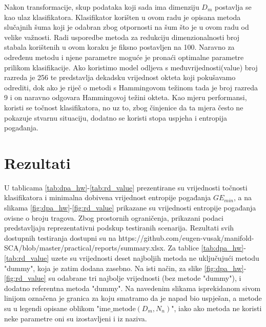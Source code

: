 \documentclass[times, utf8, diplomski]{fer}
\begin{document}
Nakon transformacije, skup podataka koji sada ima dimenziju $D_m$ postavlja se kao ulaz klasifikatora. Klasifikator korišten u ovom radu je opisana metoda slučajnih šuma koji je odabran zbog otpornosti na šum što je u ovom  radu od velike važnosti. Radi usporedbe metoda za redukciju dimenzionalnosti broj stabala korištenih u ovom koraku je fiksno postavljen na 100. Naravno za određenu metodu i njene parametre moguće je pronaći optimalne parametre prilikom klasifikacije. Ako koristimo model odljeva s međuvrijednosti(value) broj razreda je 256 te predstavlja dekadsku vrijednost okteta koji pokušavamo odrediti, dok ako je riječ o metodi s Hammingovom težinom tada je broj razreda 9 i on naravno odgovara Hammingovoj težini okteta. Kao mjeru performansi, koristi se točnost klasifikatora, no uz to, zbog činjenice da ta mjera često ne pokazuje stvarnu situaciju, dodatno se koristi stopa uspjeha  i entropija pogađanja.

\section{Rezultati}

U tablicama \ref{tab:dpa_hw}-\ref{tab:rd_value} prezentirane su vrijednosti točnosti klasifikatora i minimalna dobivena vrijednost entropije pogađanja $GE_{min}$, a na slikama \ref{fig:dpa_hw}-\ref{fig:rd_value} prikazane su vrijednosti entropije pogađanja ovisne o broju tragova. Zbog prostornih ograničenja, prikazani podaci predstavljaju reprezentativni podskup testiranih scenarija. Rezultati svih dostupnih testiranja dostupni su na https://github.com/eugen-vusak/manifold-SCA/blob/master/practical/reports/summary.xlsx. Za tablice \ref{tab:dpa_hw}-\ref{tab:rd_value} uzete su vrijednosti deset najboljih metoda ne uključujući metodu "dummy", koja je zatim dodana zasebno. Na isti način, za slike \ref{fig:dpa_hw}-\ref{fig:rd_value} su odabrane tri najbolje vrijednosti (bez  metode "dummy"), i dodatno referentna metoda "dummy". Na navedenim slikama isprekidanom sivom linijom označena je granica za koju smatramo da je napad bio uspješan, a metode su u legendi opisane oblikom "$\text{ime\_metode}(D_m, N_n)$", iako ako metoda ne koristi neke parametre oni su izostavljeni i iz naziva.
\end{document}
